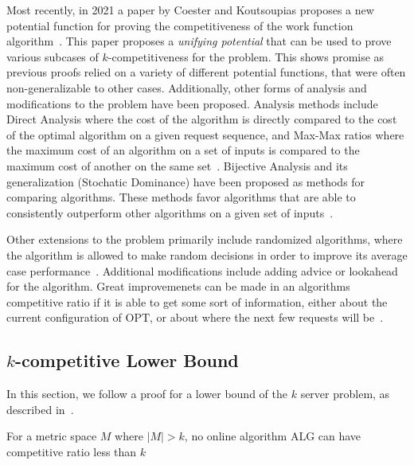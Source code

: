Most recently, in 2021 a paper by Coester and Koutsoupias proposes a new potential function for proving the competitiveness of the work function algorithm~\cite{unifyingPotential2021}. This paper proposes a \textit{unifying potential} that can be used to prove various subcases of $k$-competitiveness for the \KS problem. This shows promise as previous proofs relied on a variety of different potential functions, that were often non-generalizable to other cases.
Additionally, other forms of analysis and modifications to the \KS problem have been proposed. Analysis methods include Direct Analysis where the cost of the algorithm is directly compared to the cost of the optimal algorithm on a given request sequence, and Max-Max ratios where the maximum cost of an algorithm on a set of inputs is compared to the maximum cost of another on the same set~\cite{MAXMAX2005}. Bijective Analysis and its generalization (Stochatic Dominance) have been proposed as methods for comparing algorithms. These methods favor algorithms that are able to consistently outperform other algorithms on a given set of inputs~\cite{bij2016}. 

Other extensions to the \KS problem primarily include randomized algorithms, where the algorithm is allowed to make random decisions in order to improve its average case performance~\cite{OnlineComp1998}. Additional modifications include adding advice or lookahead for the algorithm. Great improvemenets can be made in an algorithms competitive ratio if it is able to get some sort of information, either about the current configuration of $\mathrm{OPT}$, or about where the next few requests will be~\cite{advice2015}.

\subsection{$k$-competitive Lower Bound}
\label{sec:lowerBound}

In this section, we follow a proof for a lower bound of the $k$ server problem, as described in~\cite{server2009}.

\begin{lemma}
    For a metric space $M$ where $|M| > k$, no online algorithm $\mathrm{ALG}$ can have competitive ratio less than $k$
\end{lemma}

